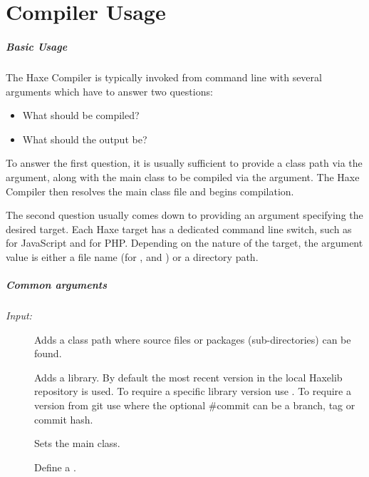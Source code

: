 \chapter{Compiler Usage}
\label{compiler-usage}

\paragraph{Basic Usage}

The Haxe Compiler is typically invoked from command line with several arguments which have to answer two questions:

\begin{itemize}
	\item What should be compiled?
	\item What should the output be?
\end{itemize}
	
To answer the first question, it is usually sufficient to provide a class path via the  argument, along with the main class to be compiled via the  argument. The Haxe Compiler then resolves the main class file and begins compilation.

The second question usually comes down to providing an argument specifying the desired target. Each Haxe target has a dedicated command line switch, such as  for JavaScript and  for PHP. Depending on the nature of the target, the argument value is either a file name (for ,  and ) or a directory path.

\paragraph{Common arguments}

\emph{Input:}

\begin{description}
	\item[] Adds a class path where  source files or packages (sub-directories) can be found.
	\item[] Adds a  library. By default the most recent version in the local Haxelib repository is used. To require a specific library version use . To require a version from git use  where the optional \#commit can be a branch, tag or commit hash.
	\item[] Sets the main class.
	\item[] Define a .
\end{description}

